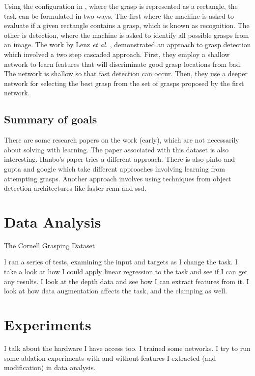 \documentclass{article}
\begin{document}
Using the configuration in \cite{jiang11}, where the grasp is represented as
a rectangle, the task can be formulated in two ways.
The first where the machine is asked to evaluate if a given rectangle contains
a grasp, which is known as recognition. The other is detection, where the
machine is asked to identify all possible grasps from an image. The work by
Lenz \textit{et al.} \cite{lenz15}, demonstrated an approach to grasp
detection which involved a two step cascaded approach. First, they employ
a shallow network to learn features that will discriminate good grasp locations
from bad. The network is shallow so that fast detection can occur. Then, they
use a deeper network for selecting the best grasp from the set of grasps
proposed by the first network.

\subsection{Summary of goals}
There are some research papers on the work (early), which are not necessarily
about solving with learning.
The paper associated with
this dataset is also interesting. Hanbo's paper tries a different approach.
There is also pinto and gupta and google which take different approaches
involving learning from attempting grasps. Another approach involves using
techniques from object detection architectures like faster rcnn and ssd.


\section{Data Analysis}
The Cornell Grasping Dataset \cite{dataset}

I ran a series of tests, examining the input and targets as I change the task.
I take a look at how I could apply linear regression to the task and see if
I can get any results. I look at the depth data and see how I can extract
features from it. I look at how data augmentation affects the task, and the
clamping as well.

\section{Experiments}
I talk about the hardware I have access too. I trained some networks. I try
to run some ablation experiments with and without features I extracted (and
modification) in data analysis.



\end{document}
